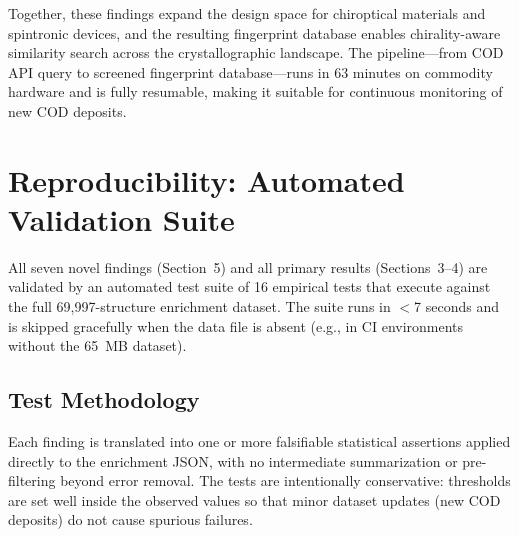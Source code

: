 \documentclass[11pt,a4paper]{article}
\begin{document}
Together, these findings expand the design space for chiroptical materials and spintronic devices, and the resulting fingerprint database enables chirality-aware similarity search across the crystallographic landscape. The pipeline---from COD API query to screened fingerprint database---runs in 63 minutes on commodity hardware and is fully resumable, making it suitable for continuous monitoring of new COD deposits.

\section{Reproducibility: Automated Validation Suite}

All seven novel findings (Section~5) and all primary results (Sections~3--4) are validated by an automated test suite of 16 empirical tests that execute against the full 69,997-structure enrichment dataset. The suite runs in $<$7 seconds and is skipped gracefully when the data file is absent (e.g., in CI environments without the 65~MB dataset).

\subsection{Test Methodology}

Each finding is translated into one or more falsifiable statistical assertions applied directly to the enrichment JSON, with no intermediate summarization or pre-filtering beyond error removal. The tests are intentionally conservative: thresholds are set well inside the observed values so that minor dataset updates (new COD deposits) do not cause spurious failures.
\end{document}
